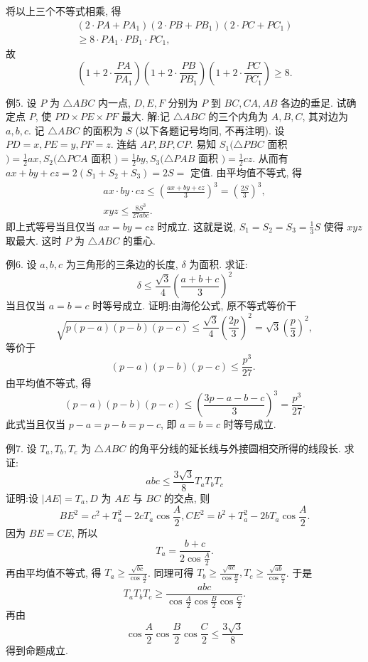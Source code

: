 将以上三个不等式相乘, 得
$$
\begin{gathered}
\left(2 \cdot P A+P A_1\right)\left(2 \cdot P B+P B_1\right)\left(2 \cdot P C+P C_1\right) \\
\geqslant 8 \cdot P A_1 \cdot P B_1 \cdot P C_1,
\end{gathered}
$$
故
$$
\left(1+2 \cdot \frac{P A}{P A_1}\right)\left(1+2 \cdot \frac{P B}{P B_1}\right)\left(1+2 \cdot \frac{P C}{P C_1}\right) \geqslant 8 .
$$



例5. 设 $P$ 为 $\triangle A B C$ 内一点, $D, E, F$ 分别为 $P$ 到 $B C, C A, A B$ 各边的垂足.
试确定点 $P$, 使 $P D \times P E \times P F$ 最大.
解:记 $\triangle A B C$ 的三个内角为 $A, B, C$, 其对边为 $a, b, c$. 记 $\triangle A B C$ 的面积为 $S$ (以下各题记号均同, 不再注明).
设 $P D=x, P E=y, P F=z$. 连结 $A P, B P, C P$. 易知 $S_1(\triangle P B C$ 面积 $)=\frac{1}{2} a x, S_2(\triangle P C A$ 面积 $)=\frac{1}{2} b y, S_3(\triangle P A B$ 面积 $)=\frac{1}{2} c z$.
从而有 $a x+b y+c z=2\left(S_1+S_2+S_3\right)=2 S=$ 定值.
由平均值不等式, 得
$$
\begin{gathered}
a x \cdot b y \cdot c z \leqslant\left(\frac{a x+b y+c z}{3}\right)^3=\left(\frac{2 S}{3}\right)^3, \\
x y z \leqslant \frac{8 S^3}{27 a b c} .
\end{gathered}
$$
即上式等号当且仅当 $a x=b y=c z$ 时成立.
这就是说, $S_1=S_2=S_3=\frac{1}{3} S$ 使得 $x y z$ 取最大.
这时 $P$ 为 $\triangle A B C$ 的重心.



例6. 设 $a, b, c$ 为三角形的三条边的长度, $\delta$ 为面积.
求证:
$$
\delta \leqslant \frac{\sqrt{3}}{4}\left(\frac{a+b+c}{3}\right)^2
$$
当且仅当 $a=b=c$ 时等号成立.
证明:由海伦公式, 原不等式等价干
$$
\sqrt{p(p-a)(p-b)(p-c)} \leqslant \frac{\sqrt{3}}{4}\left(\frac{2 p}{3}\right)^2=\sqrt{3}\left(\frac{p}{3}\right)^2,
$$
等价于
$$
(p-a)(p-b)(p-c) \leqslant \frac{p^3}{27} \text {. }
$$
由平均值不等式, 得
$$
(p-a)(p-b)(p-c) \leqslant\left(\frac{3 p-a-b-c}{3}\right)^3=\frac{p^3}{27} .
$$
此式当且仅当 $p-a=p-b=p-c$, 即 $a=b=c$ 时等号成立.



例7. 设 $T_a, T_b, T_c$ 为 $\triangle A B C$ 的角平分线的延长线与外接圆相交所得的线段长.
求证:
$$
a b c \leqslant \frac{3 \sqrt{3}}{8} T_a T_b T_c
$$
证明:设 $|A E|=T_a, D$ 为 $A E$ 与 $B C$ 的交点, 则
$$
B E^2=c^2+T_a^2-2 c T_a \cos \frac{A}{2}, C E^2=b^2+T_a^2-2 b T_a \cos \frac{A}{2} .
$$
因为 $B E=C E$, 所以
$$
T_a=\frac{b+c}{2 \cos \frac{A}{2}} .
$$
再由平均值不等式, 得 $T_a \geqslant \frac{\sqrt{b c}}{\cos \frac{A}{2}}$.
同理可得 $T_b \geqslant \frac{\sqrt{a c}}{\cos \frac{B}{2}}, T_c \geqslant \frac{\sqrt{a b}}{\cos \frac{C}{2}}$. 于是
$$
T_a T_b T_c \geqslant \frac{a b c}{\cos \frac{A}{2} \cos \frac{B}{2} \cos \frac{C}{2}} .
$$
再由
$$
\cos \frac{A}{2} \cos \frac{B}{2} \cos \frac{C}{2} \leqslant \frac{3 \sqrt{3}}{8}
$$
得到命题成立.




